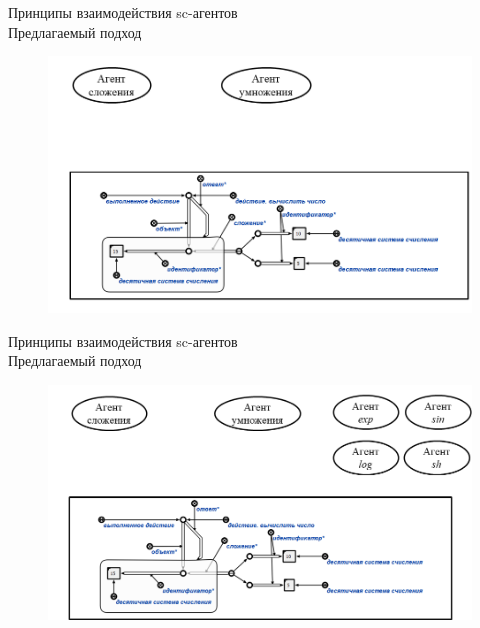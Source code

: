 \begin{frame}{Принципы взаимодействия sc-агентов\\Предлагаемый подход}
	\topline
	\justifying
	\vspace{3em}
	\begin{figure}[H]
		\includegraphics[scale=0.45]{./figures/sd_multiagent_processing/agent4.png}
	\end{figure}
\end{frame}

\begin{frame}{Принципы взаимодействия sc-агентов\\Предлагаемый подход}
	\topline
	\justifying
	\vspace{3em}
	\begin{figure}[H]
		\includegraphics[scale=0.45]{./figures/sd_multiagent_processing/agent5.png}
	\end{figure}
\end{frame}

